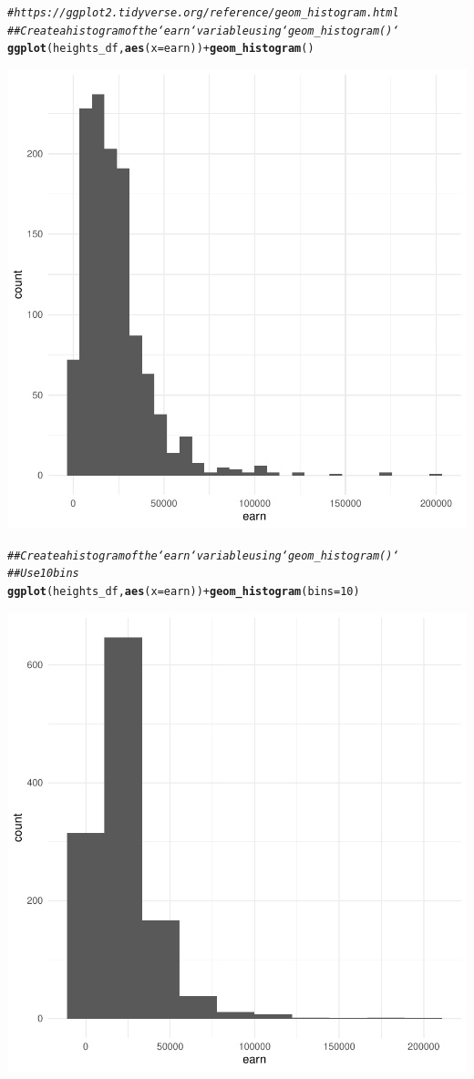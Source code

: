 \documentclass{article}\usepackage[]{graphicx}\usepackage[]{xcolor}
\makeatletter
\newcommand{\hlnum}[1]{\textcolor[rgb]{0.686,0.059,0.569}{#1}}%
\newcommand{\hlcom}[1]{\textcolor[rgb]{0.678,0.584,0.686}{\textit{#1}}}%
\newcommand{\hlopt}[1]{\textcolor[rgb]{0,0,0}{#1}}%
\newcommand{\hlstd}[1]{\textcolor[rgb]{0.345,0.345,0.345}{#1}}%
\newcommand{\hlkwc}[1]{\textcolor[rgb]{0.333,0.667,0.333}{#1}}%
\newcommand{\hlkwd}[1]{\textcolor[rgb]{0.737,0.353,0.396}{\textbf{#1}}}%
\newenvironment{kframe}{%
 \def\at@end@of@kframe{}%
 \ifinner\ifhmode%
  \def\at@end@of@kframe{\end{minipage}}%
  \begin{minipage}{\columnwidth}%
 \fi\fi%
 \def\FrameCommand##1{\hskip\@totalleftmargin \hskip-\fboxsep
 \colorbox{shadecolor}{##1}\hskip-\fboxsep
     \hskip-\linewidth \hskip-\@totalleftmargin \hskip\columnwidth}%
 \MakeFramed {\advance\hsize-\width
   \@totalleftmargin\z@ \linewidth\hsize
   \@setminipage}}%
 {\par\unskip\endMakeFramed%
 \at@end@of@kframe}
\newenvironment{knitrout}{}{} %
\makeatother
\begin{document}
\begin{knitrout}
{}


\begin{kframe}\begin{alltt}
\hlcom{# https://ggplot2.tidyverse.org/reference/geom_histogram.html}
\hlcom{## Create a histogram of the `earn` variable using `geom_histogram()`}
\hlkwd{ggplot}\hlstd{(heights_df,} \hlkwd{aes}\hlstd{(}\hlkwc{x} \hlstd{= earn))} \hlopt{+} \hlkwd{geom_histogram}\hlstd{()}
\end{alltt}


{\ttfamily\noindent\itshape\color{messagecolor}{\#\# `stat\_bin()` using `bins = 30`. Pick better value with `binwidth`.}}\end{kframe}

{\centering \includegraphics[width=.6\linewidth]{figure/assignment-03-Quintero-Vasquez-Johnatan-Rnwauto-report-9} 

}


\begin{kframe}\begin{alltt}
\hlcom{## Create a histogram of the `earn` variable using `geom_histogram()`}
\hlcom{## Use 10 bins}
\hlkwd{ggplot}\hlstd{(heights_df,} \hlkwd{aes}\hlstd{(}\hlkwc{x} \hlstd{= earn))} \hlopt{+} \hlkwd{geom_histogram}\hlstd{(}\hlkwc{bins} \hlstd{=} \hlnum{10}\hlstd{)}
\end{alltt}
\end{kframe}

{\centering \includegraphics[width=.6\linewidth]{figure/assignment-03-Quintero-Vasquez-Johnatan-Rnwauto-report-10} 

}
\end{knitrout}
\end{document}
